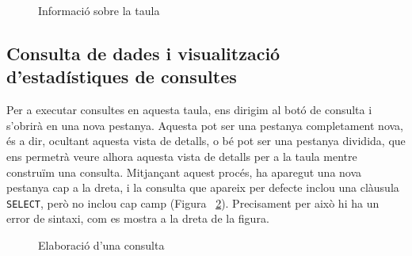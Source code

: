 \documentclass[11pt,longbibliography]{article}
\theoremstyle{definition}
\theoremstyle{remark}
\begin{document}
\begin{figure}[h!]
\par
{}%
\hfill
{}%
\par

\caption{Informació sobre la taula}
\label{fig:bq13}
\end{figure}



\subsection{Consulta de dades i visualització d'estadístiques de consultes}

Per a executar consultes en aquesta taula, ens dirigim al botó de consulta i s'obrirà en una nova pestanya. Aquesta pot ser una pestanya completament nova, és a dir, ocultant aquesta vista de detalls, o bé pot ser una pestanya dividida, que ens permetrà veure alhora aquesta vista de detalls per a la taula mentre construïm una consulta. Mitjançant aquest procés, ha aparegut una nova pestanya cap a la dreta, i la consulta que apareix per defecte inclou una clàusula \verb|SELECT|, però no inclou cap camp (Figura ~\ref{fig:bq14}). Precisament per això hi ha un error de sintaxi, com es mostra a la dreta de la figura. 


\begin{figure}[h!]
\par
{}%
\hfill
{}%
\par

\caption{Elaboració d'una consulta}
\label{fig:bq14}
\end{figure}
\end{document}
